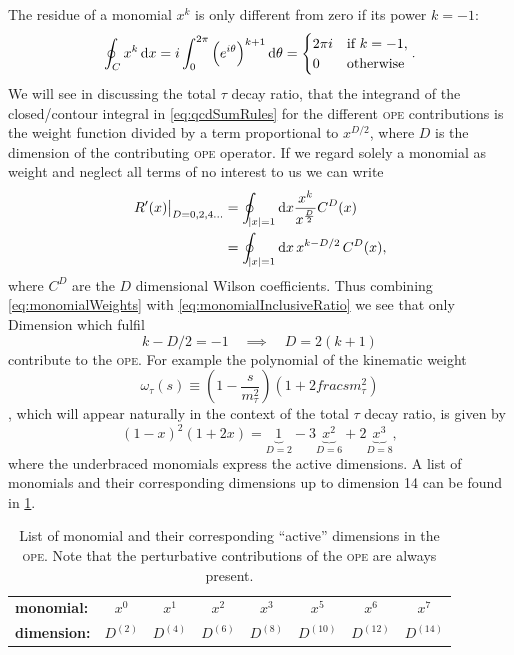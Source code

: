 \documentclass[../../index.tex]{subfiles}
\begin{document}
The residue of a monomial \(x^k\) is only different from zero if its power
\(k=-1\):
\begin{equation}
  \label{eq:monomialWeights}
  \oint_{C} x^k \dif x = i \int_0^{2\pi}\left(e^{i \theta}\right)^{k+1} \dif \theta
  = \begin{cases} \mbox{\(2 \pi i\)} & \mbox{if } k=-1, \\ \mbox{0} & \mbox{otherwise} \end{cases}.
\end{equation}
We will see in discussing the total \(\tau\) decay ratio, that the integrand of
the closed\-/contour integral in \cref{eq:qcdSumRules} for the different
\textsc{ope} contributions is the weight function divided by a term proportional
to \(x^{D/2}\), where \(D\) is the dimension of the contributing \textsc{ope}
operator. If we regard solely a monomial as weight and neglect all terms of no
interest to us we can write
\begin{equation}
  \label{eq:monomialInclusiveRatio}
  \begin{split}
    \left. R^\prime(x) \right\rvert_{D=0,2,4\dots} &= \oint_{\abs{x}=1} \dif x \frac{x^k}{x^{\frac{D}{2}}}C^{D}(x) \\
    &= \oint_{\abs{x}=1} \dif x \,x^{k-D/2} \,C^{D}(x),
  \end{split}
\end{equation}
where \(C^{D}\) are the \(D\) dimensional Wilson coefficients. Thus combining
\cref{eq:monomialWeights} with \cref{eq:monomialInclusiveRatio} we see that only
Dimension which fulfil
\begin{equation}
  k - D/2 = -1 \quad \implies \quad  D = 2(k+1)
\end{equation}
contribute to the \textsc{ope}. For example the polynomial of the kinematic
weight
\begin{equation}
  \label{eq:kinematicWeight}
  \omega_\tau(s) \equiv \left( 1 - \frac{s}{m_\tau^2} \right) \left( 1 + 2 frac{s}{m_\tau^2} \right)
\end{equation},
which will appear naturally in the context of the total \(\tau\) decay ratio,
is given by
\begin{equation}
  (1 - x)^2 (1 + 2x) = \underbrace{1}_{D=2} - 3\underbrace{x^2}_{D=6} + 2\underbrace{x^3}_{D=8},
\end{equation}
where the underbraced monomials express the active dimensions. A list of
monomials and their corresponding dimensions up to dimension 14 can be found in
\cref{table:monomialDimensions}.
\begin{table}
  \centering
  \begin{tabular}{l|ccccccc}
    \toprule
    \textbf{monomial:} & \(x^0\) & \(x^1\) & \(x^2\) & \(x^3\) & \(x^5\) & \(x^6\) & \(x^7\)\\
    \textbf{dimension:} & \(D^{(2)}\) & \(D^{(4)}\) & \(D^{(6)}\) & \(D^{(8)}\) & \(D^{(10)}\) & \(D^{(12)}\) & \(D^{(14)}\)\\
    \bottomrule 
  \end{tabular}
  \caption{List of monomial and their corresponding ``active'' dimensions in the
    \textsc{ope}. Note that the perturbative contributions of the \textsc{ope}
    are always present.}
  \label{table:monomialDimensions}
\end{table}
\end{document}
